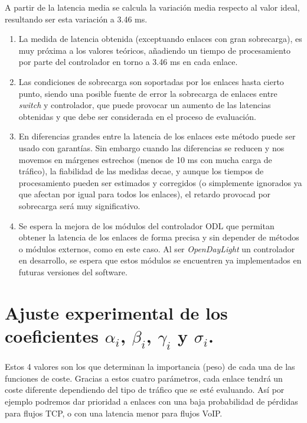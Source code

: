 \documentclass[a4paper,11pt]{book}
\begin{document}
A partir de la latencia media se calcula la variación media respecto al valor ideal, resultando ser esta variación a 3.46 ms.

\begin{enumerate}
\item La medida de latencia obtenida (exceptuando enlaces con gran sobrecarga), es muy próxima a los valores teóricos, añadiendo un tiempo de procesamiento por parte del controlador en torno a 3.46 ms en cada enlace.
\item Las condiciones de sobrecarga son soportadas por los enlaces hasta cierto punto, siendo una posible fuente de error la sobrecarga de enlaces entre \textit{switch} y controlador, que puede provocar un aumento de las latencias obtenidas y que debe ser considerada en el proceso de evaluación.
\item En diferencias grandes entre la latencia de los enlaces este método puede ser usado con garantías. Sin embargo cuando las diferencias se reducen y nos movemos en márgenes estrechos (menos de 10 ms con mucha carga de tráfico), la fiabilidad de las medidas decae, y aunque los tiempos de procesamiento pueden ser estimados y corregidos (o simplemente ignorados ya que afectan por igual para todos los enlaces), el retardo provocad por sobrecarga será muy significativo.
\item Se espera la mejora de los módulos del controlador \ac{ODL} que permitan obtener la latencia de los enlaces de forma precisa y sin depender de métodos o módulos externos, como en este caso. Al ser \emph{OpenDayLight} un controlador en desarrollo, se espera que estos módulos se encuentren ya implementados en futuras versiones del software.
\end{enumerate}
 
 
%
%


\section{Ajuste experimental de los coeficientes $\alpha_i$, $\beta_i$, $\gamma_i$ y $\sigma_i$.}
\label{sec:evaluacion2}

Estos 4 valores son los que determinan la importancia (peso) de cada una de las funciones de coste. Gracias a estos cuatro parámetros, cada enlace tendrá un coste diferente dependiendo del tipo de tráfico que se esté evaluando. Así por ejemplo podremos dar prioridad a enlaces con una baja probabilidad de pérdidas para flujos \ac{TCP}, o con una latencia menor para flujos \ac{VoIP}. 
\end{document}
